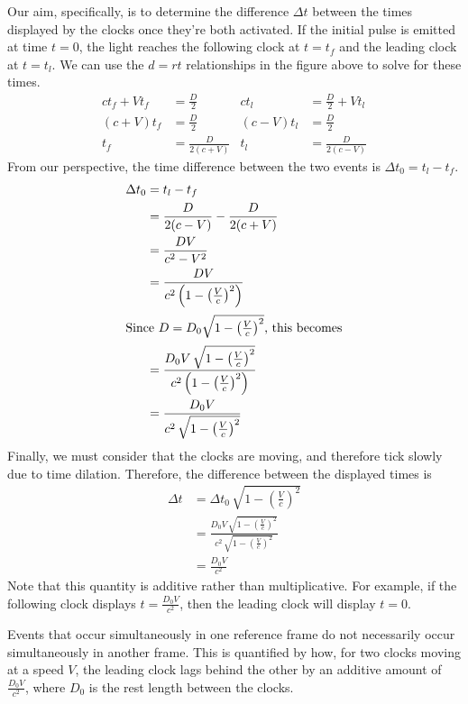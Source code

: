 \documentclass[10pt,a4paper,oneside]{book}
\begin{document}
Our aim, specifically, is to determine the difference $\Delta t$ between the times displayed by the clocks once they're both activated.
If the initial pulse is emitted at time $t = 0$, the light reaches the following clock at $t = t_f$ and the leading clock at $t = t_l$.
We can use the $d = rt$ relationships in the figure above to solve for these times.
\begin{align*}
    ct_f + Vt_f &= \frac{D}{2} & ct_l &= \frac{D}{2} + Vt_l \\
    (c + V)t_f &= \frac{D}{2} & (c - V)t_l &= \frac{D}{2} \\
    t_f &= \frac{D}{2(c + V)} & t_l &= \frac{D}{2(c - V)}
\end{align*}
From our perspective, the time difference between the two events is $\Delta t_0 = t_l - t_f$.
\begin{align*}
    \Delta t_0 &= t_l - t_f \\
    &= \frac{D}{2 (c - V)} - \frac{D}{2 (c + V)} \\
    &= \frac{DV}{c^2 - V^2} \\
    &= \frac{DV}{c^2 \left( 1 - \left( \frac{V}{c} \right)^2  \right)} \\
    \intertext{Since $D = D_0\sqrt{1 - \left( \frac{V}{c} \right)^2}$, this becomes}
    &= \frac{D_0 V \, \sqrt{ 1 - \left( \frac{V}{c} \right)^2 }}{c^2 \left( 1 - \left( \frac{V}{c} \right)^2  \right)} \\
    &= \frac{D_0 V}{c^2 \,\sqrt{ 1 - \left( \frac{V}{c} \right)^2 }}
\end{align*}
Finally, we must consider that the clocks are moving, and therefore tick slowly due to time dilation.
Therefore, the difference between the displayed times is
\begin{align}
    \Delta t &= \Delta t_0 \, \sqrt{ 1 - \left( \frac{V}{c} \right)^2} \\
    &= \frac{D_0 V \, \sqrt{ 1 - \left( \frac{V}{c} \right)^2}}{c^2 \, \sqrt{ 1 - \left( \frac{V}{c} \right)^2}} \\
    &= \frac{D_0 V}{c^2}
\end{align}
Note that this quantity is additive rather than multiplicative.
For example, if the following clock displays $t = \frac{D_0V}{c^2}$, then the leading clock will display $t = 0$.

\begin{summary}
    Events that occur simultaneously in one reference frame do not necessarily occur simultaneously in another frame.
    This is quantified by how, for two clocks moving at a speed $V$, the leading clock lags behind the other by an additive amount of $\frac{D_0V}{c^2}$, where $D_0$ is the rest length between the clocks.
\end{summary}
\end{document}
